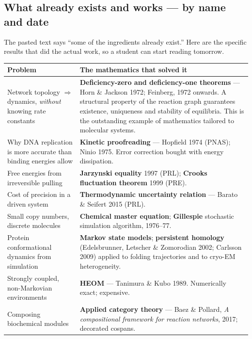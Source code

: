 \subsection{What already exists and works --- by name and date}

The pasted text says ``some of the ingredients already exist.'' Here are the specific results that
did the actual work, so a student can start reading tomorrow.

\begin{center}\small
\begin{tabular}{@{}>{\raggedright\arraybackslash}p{4.5cm}>{\raggedright\arraybackslash}p{11.7cm}@{}}
\toprule
\rowcolor{nano!13}
\textbf{\color{nano}Problem} & \textbf{\color{nano}The mathematics that solved it}\\
\midrule
Network topology $\Rightarrow$ dynamics, \emph{without} knowing rate constants &
 \textbf{Deficiency-zero and deficiency-one theorems} --- Horn \& Jackson 1972; Feinberg, 1972
 onwards. A structural property of the reaction graph guarantees existence, uniqueness and stability
 of equilibria. This is the outstanding example of mathematics tailored to molecular systems.\\
Why DNA replication is more accurate than binding energies allow &
 \textbf{Kinetic proofreading} --- Hopfield 1974 (PNAS); Ninio 1975. Error correction bought with
 energy dissipation.\\
Free energies from irreversible pulling &
 \textbf{Jarzynski equality} 1997 (PRL); \textbf{Crooks fluctuation theorem} 1999 (PRE).\\
Cost of precision in a driven system &
 \textbf{Thermodynamic uncertainty relation} --- Barato \& Seifert 2015 (PRL).\\
Small copy numbers, discrete molecules &
 \textbf{Chemical master equation}; \textbf{Gillespie} stochastic simulation algorithm, 1976--77.\\
Protein conformational dynamics from simulation &
 \textbf{Markov state models}; \textbf{persistent homology} (Edelsbrunner, Letscher \& Zomorodian
 2002; Carlsson 2009) applied to folding trajectories and to cryo-EM heterogeneity.\\
Strongly coupled, non-Markovian environments &
 \textbf{HEOM} --- Tanimura \& Kubo 1989. Numerically exact; expensive.\\
Composing biochemical modules &
 \textbf{Applied category theory} --- Baez \& Pollard, \textit{A compositional framework for reaction
 networks}, 2017; decorated cospans.\\
\bottomrule
\end{tabular}
\end{center}

